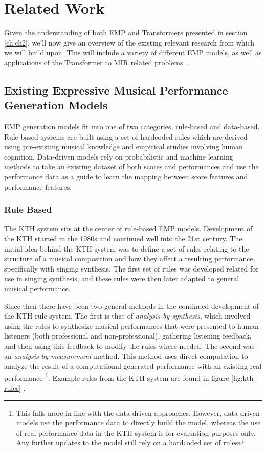 \chapter{Related Work}\label{ch:ch3}
Given the understanding of both EMP and Transformers presented in section \ref{ch:ch2}, we'll  now give an overview of the existing relevant research from which we will build upon. This will include a variety of different EMP models, as well as applications of the Transformer to MIR related problems. . 

\section{Existing Expressive Musical Performance Generation Models}
EMP generation models fit into one of two categories, rule-based and data-based. Rule-based systems are built using a set of hardcoded rules which are derived using pre-existing musical knowledge and empirical studies involving human cognition. Data-driven models rely on probabilistic and machine learning methods to take an existing dataset of both scores and performances and use the performance data as a guide to learn the mapping between score features and performance features. 

\subsection{Rule Based}
The KTH system \cite{friberg2006overview} sits at the center of rule-based EMP models. Development of the KTH started in the 1980s and continued well into the 21st century. The initial idea behind the KTH system was to define a set of rules relating to the structure of a musical composition and how they affect a resulting performance, specifically with singing synthesis. The first set of rules was developed related for use in singing synthesis, and these rules were then later adapted to general musical performance. 

Since then there have been two general methods in the continued development of the KTH rule system. The first is that of \emph{analysis-by-synthesis}, which involved using the rules to synthesize musical performances that were presented to human listeners (both professional and non-professional), gathering listening feedback, and then using this feedback to modify the rules where needed. The second was an \emph{analysis-by-measurement} method. This method uses direct computation to analyze the result of a computational generated performance with an existing real performance \footnote{This falls more in line with the data-driven approaches. However, data-driven models use the performance data to directly build the model, whereas the use of real performance data in the KTH system is for evaluation purposes only. Any further updates to the model still rely on a hardcoded set of rules}. Example rules from the KTH system are found in figure \ref{fig:kth-rules} . 

